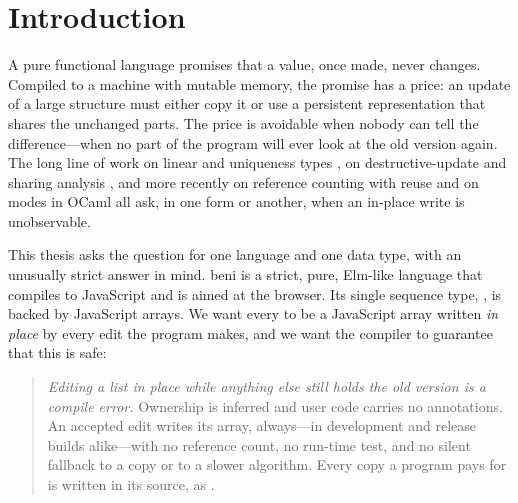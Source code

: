 \chapter{Introduction}
\label{sec:intro}

A pure functional language promises that a value, once made, never changes. Compiled to a
machine with mutable memory, the promise has a price: an update of a large structure must either
copy it or use a persistent representation that shares the unchanged parts. The price is
avoidable when nobody can tell the difference---when no part of the program will ever look at the
old version again. The long line of work on linear and uniqueness types
\citep{wadler1990linear,wadler1991use,smetsers1994guaranteeing,barendsen1996uniqueness,devries2008simplified},
on destructive-update and sharing analysis
\citep{bloss1989update,jones1989compile,wand2001set,cann1990sisal,aspinall2008usage,mazur2004thesis},
and more recently on reference counting with reuse
\citep{ullrich2019beans,reinking2021perceus,lorenzen2023fp2} and on modes in OCaml
\citep{lorenzen2024oxidizing} all ask, in one form or another, when an in-place write is
unobservable.

This thesis asks the question for one language and one data type, with an unusually strict
answer in mind. beni \citep{beni2026} is a strict, pure, Elm-like language that compiles to
JavaScript and is aimed at the browser. Its single sequence type, , is backed by
JavaScript arrays. We want every  to be a JavaScript array written \emph{in place} by
every edit the program makes, and we want the compiler to guarantee that this is safe:

\begin{quote}
\emph{Editing a list in place while anything else still holds the old version is a compile error.}
Ownership is inferred and user code carries no annotations. An accepted edit writes its array,
always---in development and release builds alike---with no reference count, no run-time test, and
no silent fallback to a copy or to a slower algorithm. Every copy a program pays for is written in
its source, as .
\end{quote}

